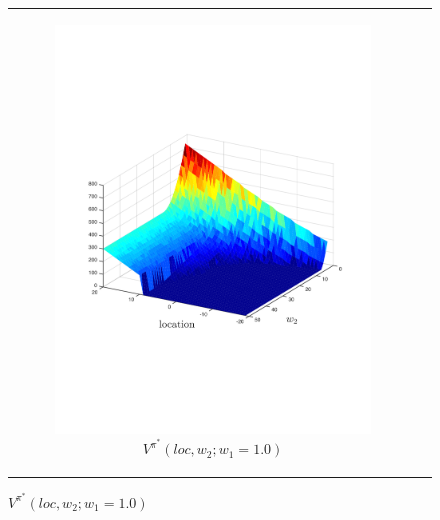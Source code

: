 {\centering
	\begin{figure}[t!]
		\begin{tabular}{cc}
			\begin{subfigure}{0.22\textwidth}\centering\includegraphics[width=\textwidth]{images/robot_vf_new}\caption{{\footnotesize $V^{\pi^{*}}(loc, w_2; w_1 = 1.0)$} }\label{fig:navigation_vf}\end{subfigure}&

\end{tabular}
\end{figure}}
